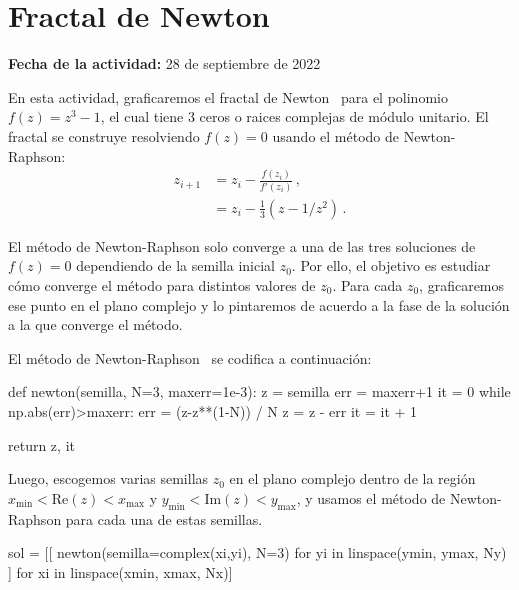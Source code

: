 \documentclass[../portafolio.tex]{subfiles}
\begin{document}
\chapter{Fractal de Newton} 

\hfill \textbf{Fecha de la actividad:} 28 de septiembre de 2022

\medskip

En esta actividad, graficaremos el fractal de Newton~\cite{ref:newton-fractal} para el polinomio
$f(z)=z^3-1$, el cual tiene 3 ceros o raices complejas de módulo
unitario. El fractal se construye resolviendo $f(z)=0$ usando el
método de Newton-Raphson:
\begin{align}
  \label{eq:newton-raphson}
  z_{i+1}
  &= z_{i} - \frac{f(z_i)}{f'(z_i)} \,,
  \\
  &= z_{i} - \frac{1}{3} \left( z - 1/z^2\right) \,.
\end{align}
%  

El método de Newton-Raphson solo converge a una de las tres soluciones
de $f(z)=0$ dependiendo de la semilla inicial $z_0$. Por ello, el
objetivo es estudiar cómo converge el método para distintos valores de
$z_0$. Para cada $z_0$, graficaremos ese punto en el plano complejo y
lo pintaremos de acuerdo a la fase de la solución a la que converge el
método.


El método de Newton-Raphson~\cite{ref:newton-raphson} se codifica a continuación:
\begin{pythoncode}
def newton(semilla, N=3, maxerr=1e-3):
    z   = semilla
    err = maxerr+1
    it = 0
    while np.abs(err)>maxerr:
        err = (z-z**(1-N)) / N
        z = z - err
        it = it + 1

    return z, it
\end{pythoncode}


Luego, escogemos varias semillas $z_0$ en el plano complejo dentro de la
región $x_\text{min}<\text{Re}(z)<x_\text{max}$ y
$y_\text{min}<\text{Im}(z)<y_\text{max}$, y usamos el método de
Newton-Raphson para cada una de estas semillas.
\begin{pythoncode}
  sol = [[ newton(semilla=complex(xi,yi), N=3)
           for yi in linspace(ymin, ymax, Ny)
         ]
         for xi in linspace(xmin, xmax, Nx)]
\end{pythoncode}
\end{document}
